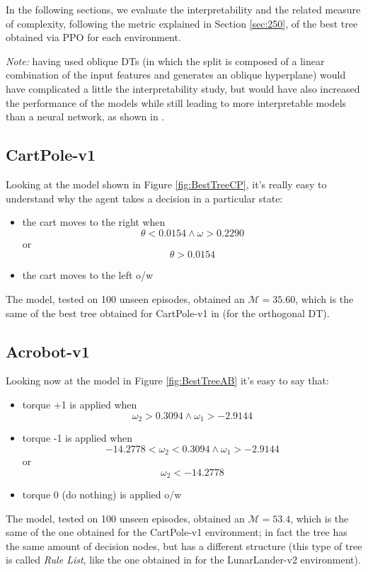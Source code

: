In the following sections, we evaluate the interpretability and the related measure of complexity, following the metric explained in Section \ref{sec:250}, of the best tree obtained via PPO for each environment.

\textit{Note:} having used oblique DTs (in which the split is composed of a linear combination of the input features and generates an oblique hyperplane) would have complicated a little the interpretability study, but would have also increased the performance of the models while still leading to more interpretable models than a neural network, as shown in \cite{custode}.

\subsection{CartPole-v1}
\label{subsec:441}
Looking at the model shown in Figure \ref{fig:BestTreeCP}, it's really easy to understand why the agent takes a decision in a particular state: 
\begin{itemize}
    \item the cart moves to the right when \[\theta < 0.0154 \land \omega > 0.2290\] or \[\theta > 0.0154\]
    \item the cart moves to the left o/w
\end{itemize}
The model, tested on 100 unseen episodes, obtained an $\mathcal{M}=35.60$, which is the same of the best tree obtained for CartPole-v1 in \cite{custode} (for the orthogonal DT).



\subsection{Acrobot-v1}
\label{subsec:442}
Looking now at the model in Figure \ref{fig:BestTreeAB} it's easy to say that:
\begin{itemize}
    \item torque +1 is applied when \[\omega_2 > 0.3094 \land \omega_1 > -2.9144\]
    \item torque -1 is applied when \[-14.2778 < \omega_2 < 0.3094 \land \omega_1 > -2.9144\] or \[\omega_2 < -14.2778\]
    \item torque 0 (do nothing) is applied o/w
\end{itemize}
The model, tested on 100 unseen episodes, obtained an $\mathcal{M}=53.4$, which is the same of the one obtained for the CartPole-v1 environment; in fact the tree has the same amount of decision nodes, but has a different structure (this type of tree is called \textit{Rule List}, like the one obtained in \cite{silva} for the LunarLander-v2 environment).


